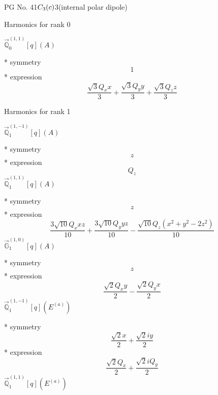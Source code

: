 \documentclass[fleqn,8pt]{jsarticle}
\begin{document}
\setcounter{MaxMatrixCols}{32}

\renewcommand{\tablename}{Table~}
\renewcommand{\figurename}{Figure~}
\begin{center}
\LARGE
PG No. 41\quad$C_{\rm 3}(c)$\quad$3$\quad[ trigonal ] (internal polar dipole)
\end{center}

\noindent * Harmonics for rank 0

\noindent\quad $\vec{\mathbb{Q}}_{0}^{(1,1)}[q](A)$

\noindent\quad ** symmetry
\begin{dmath*}
1
\end{dmath*}
\noindent\quad ** expression
\begin{dmath*}
\frac{\sqrt{3} Q_{x} x}{3} + \frac{\sqrt{3} Q_{y} y}{3} + \frac{\sqrt{3} Q_{z} z}{3}
\end{dmath*}

\noindent * Harmonics for rank 1

\noindent\quad $\vec{\mathbb{Q}}_{1}^{(1,-1)}[q](A)$

\noindent\quad ** symmetry
\begin{dmath*}
z
\end{dmath*}
\noindent\quad ** expression
\begin{dmath*}
Q_{z}
\end{dmath*}
\noindent\quad $\vec{\mathbb{Q}}_{1}^{(1,1)}[q](A)$

\noindent\quad ** symmetry
\begin{dmath*}
z
\end{dmath*}
\noindent\quad ** expression
\begin{dmath*}
\frac{3 \sqrt{10} Q_{x} x z}{10} + \frac{3 \sqrt{10} Q_{y} y z}{10} - \frac{\sqrt{10} Q_{z} \left(x^{2} + y^{2} - 2 z^{2}\right)}{10}
\end{dmath*}
\noindent\quad $\vec{\mathbb{G}}_{1}^{(1,0)}[q](A)$

\noindent\quad ** symmetry
\begin{dmath*}
z
\end{dmath*}
\noindent\quad ** expression
\begin{dmath*}
\frac{\sqrt{2} Q_{x} y}{2} - \frac{\sqrt{2} Q_{y} x}{2}
\end{dmath*}
\noindent\quad $\vec{\mathbb{Q}}_{1}^{(1,-1)}[q](E^{(a)})$

\noindent\quad ** symmetry
\begin{dmath*}
\frac{\sqrt{2} x}{2} + \frac{\sqrt{2} i y}{2}
\end{dmath*}
\noindent\quad ** expression
\begin{dmath*}
\frac{\sqrt{2} Q_{x}}{2} + \frac{\sqrt{2} i Q_{y}}{2}
\end{dmath*}
\noindent\quad $\vec{\mathbb{Q}}_{1}^{(1,1)}[q](E^{(a)})$
\end{document}
